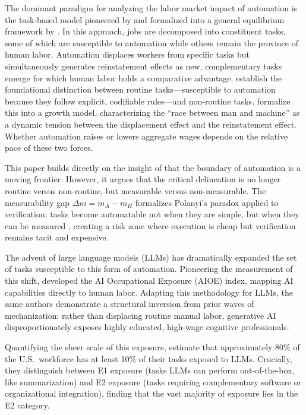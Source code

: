 \documentclass[12pt, letter]{article}
\begin{document}
The dominant paradigm for analyzing the labor market impact of automation is the task-based model pioneered by \citet{AutorLevyMurnane2003} and formalized into a general equilibrium framework by \citet{AcemogluRestrepo2018}. In this approach, jobs are decomposed into constituent tasks, some of which are susceptible to automation while others remain the province of human labor. Automation displaces workers from specific tasks but simultaneously generates reinstatement effects as new, complementary tasks emerge for which human labor holds a comparative advantage. \citet{AutorLevyMurnane2003} establish the foundational distinction between routine tasks---susceptible to automation because they follow explicit, codifiable rules---and non-routine tasks. \citet{AcemogluRestrepo2018} formalize this into a growth model, characterizing the ``race between man and machine'' as a dynamic tension between the displacement effect and the reinstatement effect. Whether automation raises or lowers aggregate wages depends on the relative pace of these two forces.

This paper builds directly on the insight of \citet{Autor2015} that the boundary of automation is a moving frontier. However, it argues that the critical delineation is no longer routine versus non-routine, but measurable versus non-measurable. The measurability gap $\Delta m = m_A - m_H$ formalizes Polanyi's paradox \citep{Polanyi1966} applied to verification: tasks become automatable not when they are simple, but when they can be measured \citep{Catalini2025}, creating a risk zone where execution is cheap but verification remains tacit and expensive.

The advent of large language models (LLMs) has dramatically expanded the set of tasks susceptible to this form of automation. Pioneering the measurement of this shift, \citet{FeltenRajSeamans2021} developed the AI Occupational Exposure (AIOE) index, mapping AI capabilities directly to human labor. Adapting this methodology for LLMs, the same authors \citep{FeltenRajSeamans2023} demonstrate a structural inversion from prior waves of mechanization: rather than displacing routine manual labor, generative AI disproportionately exposes highly educated, high-wage cognitive professionals. 

Quantifying the sheer scale of this exposure, \citet{Eloundou2024} estimate that approximately 80\% of the U.S.\ workforce has at least 10\% of their tasks exposed to LLMs. Crucially, they distinguish between E1 exposure (tasks LLMs can perform out-of-the-box, like summarization) and E2 exposure (tasks requiring complementary software or organizational integration), finding that the vast majority of exposure lies in the E2 category. 
\end{document}
